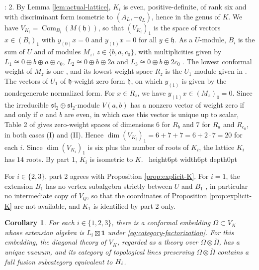 \documentclass[leqno]{article}
\let\cal\relax
\newcommand{\cal}{\mathcal}
\newcommand{\qed}{\hfill \vrule height6pt  width6pt depth0pt}
\newcommand{\ot}{\otimes}
\newtheorem{cor}[thm]{Corollary}
\newenvironment{proof}[1][]{\noindent {\it Proof #1} : }{\hbox{~}\qed
\smallskip
}
\numberwithin{equation}{section}
\begin{document}
\begin{proof}
2. By Lemma \ref{lem:actual-lattice}, $K_i$ is even, positive-definite, of rank six and with discriminant form isometric to $(A_L,-q_L)$, hence in the genus of $K$. We have $V_{K_i} = \operatorname{Com}_{B_i}(M(\mathfrak h))$, so that $(V_{K_i})_1$ is the space of vectors $x \in (B_i)_1$ with $y_{(0)}x = 0$ and $y_{(1)}x = 0$ for all $y \in \mathfrak h$. As a $U$-module, $B_i$ is the sum of $U$ and of modules $M_z$, $z \in \{b,a,c_0\}$, with multiplicities given by $L_1 \cong 0 \oplus b \oplus a \oplus c_0$, $L_2 \cong 0 \oplus b \oplus 2a$ and $L_3 \cong 0 \oplus b \oplus 2c_0$ \cite[Corollary 3.8 p.~18]{Arh26b}. The lowest conformal weight of $M_z$ is one \cite[(4.1) p.~11]{Arh26a}, and its lowest weight space $R_z$ is the $U_1$-module given in \cite[Table 2 p.~24]{Arh26a}. The vectors of $U_1$ of $\mathfrak h$-weight zero form $\mathfrak h$, on which $y_{(1)}$ is given by the nondegenerate normalized form. For $x \in R_z$, we have $y_{(1)}x \in (M_z)_0 = 0$. Since the irreducible $\mathfrak{sl}_2 \oplus \mathfrak{sl}_2$-module $V(a,b)$ has a nonzero vector of weight zero if and only if $a$ and $b$ are even, in which case this vector is unique up to scalar, Table 2 of \cite{Arh26a} gives zero-weight spaces of dimensions $6$ for $R_b$ and $7$ for $R_a$ and $R_{c_0}$, in both cases (I) and (II). Hence $\dim(V_{K_i})_1 = 6+7+7 = 6+2 \cdot 7 = 20$ for each $i$. Since $\dim(V_{K_i})_1$ is six plus the number of roots of $K_i$, the lattice $K_i$ has $14$ roots. By part 1, $K_i$ is isometric to $K$.
\end{proof}

For $i \in \{2,3\}$, part 2 agrees with Proposition \ref{prop:explicit-K}. For $i = 1$, the extension $B_1$ has no vertex subalgebra strictly between $U$ and $B_1$ \cite[Theorem 3.9(3) p.~19]{Arh26b}, in particular no intermediate copy of $V_Q$, so that the coordinates of Proposition \ref{prop:explicit-K} are not available, and $K_1$ is identified by part 2 only.

\begin{cor}
\label{cor:three-categories}
For each $i \in \{1,2,3\}$, there is a conformal embedding $\Omega \subset V_K$ whose extension algebra is $L_i \boxtimes \mathbf 1$ under \eqref{eq:category-factorization}. For this embedding, the diagonal theory of $V_K$, regarded as a theory over $\Omega \ot \overline\Omega$, has a unique vacuum, and its category of topological lines preserving $\Omega \ot \overline\Omega$ contains a full fusion subcategory equivalent to $\cal H_i$.
\end{cor}
\end{document}
